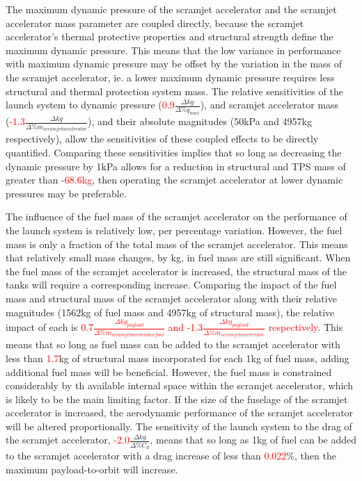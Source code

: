 The maximum dynamic pressure of the scramjet accelerator and the scramjet accelerator mass parameter are coupled directly, because the scramjet accelerator's thermal protective properties and structural strength define the maximum dynamic pressure. This means that the low variance in performance with maximum dynamic pressure may be offset by the variation in the mass of the scramjet accelerator, ie. a lower maximum dynamic pressure requires less structural and thermal protection system mass.
The relative sensitivities of the launch system to dynamic pressure (\textcolor{red}{0.9}$\frac{\Delta kg}{\Delta\%q_{max}}$), and scramjet accelerator mass (\textcolor{red}{-1.3}$\frac{\Delta kg}{\Delta\%m_{scramjet accelerator}}$), and their absolute magnitudes (50kPa and 4957kg respectively), allow the sensitivities of these coupled effects to be directly quantified. Comparing these sensitivities implies that so long as decreasing the dynamic pressure by 1kPa allows for a reduction in structural and TPS mass of greater than \textcolor{red}{-68.6kg}, then operating the scramjet accelerator at lower dynamic pressures may be preferable. 

The influence of the fuel mass of the scramjet accelerator on the performance of the launch system is relatively low, per percentage variation. However, the fuel mass is only a fraction of the total mass of the scramjet accelerator. This means that relatively small mass changes, by kg, in fuel mass are still significant. 
When the fuel mass of the scramjet accelerator is increased, the structural mass of the tanks will require a corresponding increase. 
Comparing the impact of the fuel mass and structural mass of the scramjet accelerator along with their relative magnitudes (1562kg of fuel mass and 4957kg of structural mass), the relative impact of each is \textcolor{red}{0.7$\frac{\Delta kg_{payload}}{\Delta\%m_{scramjet accelerator fuel}}$ and -1.3$\frac{\Delta kg_{payload}}{\Delta\%m_{scramjet accelerator}}$ respectively}. This means that so long as fuel mass can be added to the scramjet accelerator with less than \textcolor{red}{1.7}kg of structural mass incorporated for each 1kg of fuel mass, adding additional fuel mass will be beneficial. However, the fuel mass is constrained considerably by th available internal space within the scramjet accelerator, which is likely to be the main limiting factor.
If the size of the fuselage of the scramjet accelerator is increased, the aerodynamic performance of the scramjet accelerator will be altered proportionally. 
The sensitivity of the launch system to the drag of the scramjet accelerator, \textcolor{red}{-2.0}$\frac{\Delta kg}{\Delta\%C_{d}}$, means that so long as 1kg of fuel can be added to the scramjet accelerator with a drag increase of less than \textcolor{red}{0.022}\%, then the maximum payload-to-orbit will increase. 


